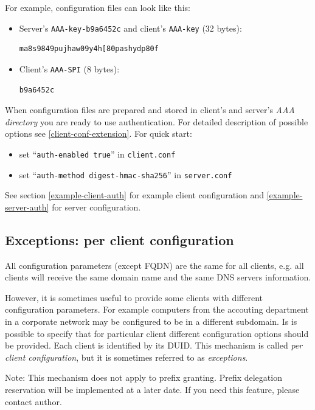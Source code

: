 For example, configuration files can look like this:

\begin{itemize}
\item Server's \texttt{AAA-key-b9a6452c} and client's \texttt{AAA-key} (32 bytes):
\begin{lstlisting}
ma8s9849pujhaw09y4h[80pashydp80f
\end{lstlisting}

\item Client's \texttt{AAA-SPI} (8 bytes):
\begin{lstlisting}
b9a6452c
\end{lstlisting}
\end{itemize}

When configuration files are prepared and stored in client's and server's
\textit{AAA directory} you are ready to use authentication. For detailed description
of possible options see \ref{client-conf-extension}. For quick start:
\begin{itemize}
 \item set ``\texttt{auth-enabled true}'' in \texttt{client.conf}

 \item set ``\texttt{auth-method digest-hmac-sha256}'' in \texttt{server.conf}

\end{itemize}

See section \ref{example-client-auth} for example client configuration
and \ref{example-server-auth} for server configuration.

\subsection{Exceptions: per client configuration}
\label{features-exceptions}
All configuration parameters (except FQDN) are the same for all
clients, e.g. all clients will receive the same domain name and the
same DNS servers information. 

However, it is sometimes useful to provide some clients with different
configuration parameters. For example computers from the accouting
department in a corporate network may be configured to be in a
different subdomain. Is is possible to specify that for particular
client different configuration options should be provided. Each client
is identified by its DUID. This mechanism is called \emph{per client
  configuration}, but it is sometimes referred to as \emph{exceptions}.

Note: This mechanism does not apply to prefix granting. Prefix
delegation reservation will be implemented at a later date. If you
need this feature, please contact author.

